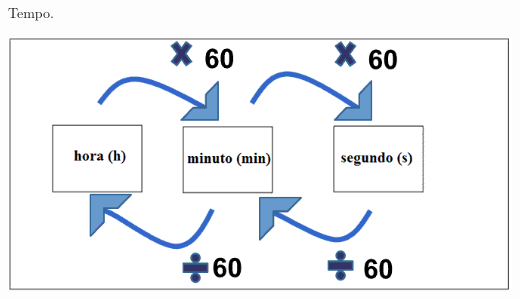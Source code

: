 \begin{multicols}{2}
\begin{flushleft}
Tempo.
\end{flushleft}
\includegraphics[scale=0.3]{figuras/conversao_tempo.png}
\end{multicols}


